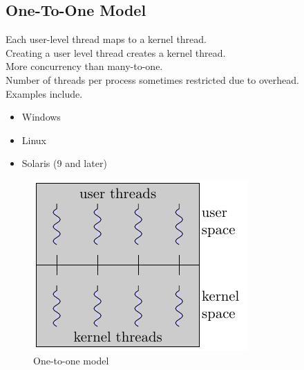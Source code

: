\documentclass{book/custombook}
\begin{document}
            \subsection{One-To-One Model}
                Each user-level thread maps to a kernel thread.\\
                Creating a user level thread creates a kernel thread.\\
                More concurrency than many-to-one.\\
                Number of threads per process sometimes restricted due to overhead.\\
                Examples include.
                \begin{itemize}
                    \item Windows
                    \item Linux
                    \item Solaris (9 and later)
                \end{itemize}
                \begin{figure}[H]
                    \centering
                    \includegraphics{figures/one_to_one.pdf}
                    \caption{One-to-one model} 
                \end{figure}
\end{document}
